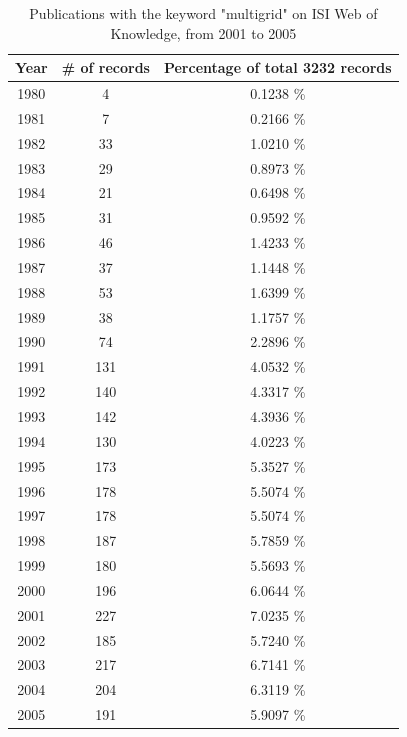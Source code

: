 \begin{table}[hbtp]
\label{tab:ISI-MG}
\begin{center}
\caption{Publications with the keyword "multigrid" on ISI Web of Knowledge, from 2001 to 2005} %
\footnotesize
 \begin{tabular}{ccc} \hline %
Year    & \# of records  &  Percentage of total 3232 records\\ \hline
1980    &   4   &   0.1238 \%  \\
1981    &   7   &   0.2166 \%  \\
1982    &   33  &   1.0210 \%  \\
1983    &   29  &   0.8973 \%  \\
1984    &   21  &   0.6498 \%  \\
1985    &   31  &   0.9592 \%  \\
1986    &   46  &   1.4233 \%  \\
1987    &   37  &   1.1448 \%  \\
1988    &   53  &   1.6399 \%  \\
1989    &   38  &   1.1757 \%  \\
1990    &   74  &   2.2896 \%  \\
1991    &   131 &   4.0532 \%  \\
1992    &   140 &   4.3317 \%  \\
1993    &   142 &   4.3936 \%  \\
1994    &   130 &   4.0223 \%  \\
1995    &   173 &   5.3527 \%  \\
1996    &   178 &   5.5074 \%  \\
1997    &   178 &   5.5074 \%  \\
1998    &   187 &   5.7859 \%  \\
1999    &   180 &   5.5693 \%  \\
2000    &   196 &   6.0644 \%  \\
2001    &   227 &   7.0235 \%  \\
2002    &   185 &   5.7240 \%  \\
2003    &   217 &   6.7141 \%  \\
2004    &   204 &   6.3119 \%  \\
2005    &   191 &   5.9097 \%  \\
\hline
\end{tabular}
\end{center}
\end{table}
